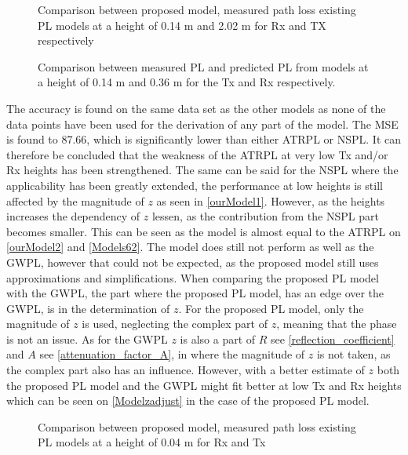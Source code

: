 \begin{figure}[H]
\centering

\caption{Comparison between proposed model, measured path loss existing PL models at a height of 0.14 m and 2.02 m for Rx and TX respectively}
\label{ourModel2}
\end{figure}

\begin{figure}[H]
\centering

\caption{Comparison between measured PL and predicted PL from models at a height of 0.14 m and 0.36 m for the Tx and Rx respectively.}
\label{Models62}
\end{figure}


The accuracy is found on the same data set as the other models as none of the data points have been used for the derivation of any part of the model. The MSE is found to 87.66, which is significantly lower than either ATRPL or NSPL. It can therefore be concluded that the weakness of the ATRPL at very low Tx and/or Rx heights has been strengthened. The same can be said for the NSPL where the applicability has been greatly extended, the performance at low heights is still affected by the magnitude of $z$ as seen in \autoref{ourModel1}. However, as the heights increases the dependency of $z$ lessen, as the contribution from the NSPL part becomes smaller. This can be seen as the model is almost equal to the ATRPL on \autoref{ourModel2} and \autoref{Models62}.  The model does still not perform as well as the GWPL, however that could not be expected, as the proposed model still uses approximations and simplifications. When comparing the proposed PL model with the GWPL, the part where the proposed PL model, has an edge over the GWPL, is in the determination of $z$. For the proposed PL model, only the magnitude of $z$ is used, neglecting the complex part of $z$, meaning that the phase is not an issue. As for the GWPL $z$ is also a part of $R$ see \eqref{reflection_coefficient} and $A$ see \eqref{attenuation_factor_A}, in where the magnitude of $z$ is not taken, as the complex part also has an influence. However, with a better estimate of $z$ both the proposed PL model and the GWPL might fit better at low Tx and Rx heights which can be seen on \autoref{Modelzadjust} in the case of the proposed PL model. 


\begin{figure}[H]
\centering

\caption{Comparison between proposed model, measured path loss existing PL models at a height of 0.04 m for Rx and Tx}
\label{ourModel1}
\end{figure}


